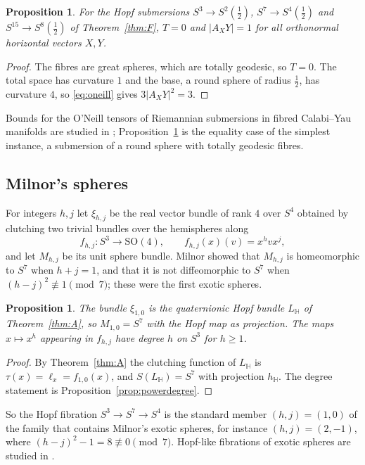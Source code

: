 \documentclass[11pt]{amsart}
\numberwithin{equation}{section}
\theoremstyle{plain}
\newtheorem{proposition}[theorem]{Proposition}
\theoremstyle{definition}
\theoremstyle{remark}
\newcommand{\Hq}{\mathbb{H}}
\newcommand{\SO}{\mathrm{SO}}
\begin{document}
\begin{proposition}\label{prop:oneill}
For the Hopf submersions $S^3\to S^2(\frac12)$, $S^7\to S^4(\frac12)$ and $S^{15}\to S^8(\frac12)$ of Theorem~\ref{thm:F}, $T=0$ and $|A_XY|=1$ for all orthonormal horizontal vectors $X,Y$.
\end{proposition}

\begin{proof}
The fibres are great spheres, which are totally geodesic, so $T=0$. The total space has curvature $1$ and the base, a round sphere of radius $\frac12$, has curvature $4$, so \eqref{eq:oneill} gives $3|A_XY|^2=3$.
\end{proof}

Bounds for the O'Neill tensors of Riemannian submersions in fibred Calabi--Yau manifolds are studied in \cite{GBN26}; Proposition~\ref{prop:oneill} is the equality case of the simplest instance, a submersion of a round sphere with totally geodesic fibres.

\subsection{Milnor's spheres}\label{sec:milnor}

For integers $h,j$ let $\xi_{h,j}$ be the real vector bundle of rank $4$ over $S^4$ obtained by clutching two trivial bundles over the hemispheres along
\[
f_{h,j}\colon S^3\to\SO(4),\qquad f_{h,j}(x)(v)=x^hvx^j,
\]
and let $M_{h,j}$ be its unit sphere bundle. Milnor \cite{Mil56} showed that $M_{h,j}$ is homeomorphic to $S^7$ when $h+j=1$, and that it is not diffeomorphic to $S^7$ when $(h-j)^2\not\equiv1\pmod 7$; these were the first exotic spheres.

\begin{proposition}\label{prop:milnorhopf}
The bundle $\xi_{1,0}$ is the quaternionic Hopf bundle $L_\Hq$ of Theorem~\ref{thm:A}, so $M_{1,0}=S^7$ with the Hopf map as projection. The maps $x\mapsto x^h$ appearing in $f_{h,j}$ have degree $h$ on $S^3$ for $h\ge1$.
\end{proposition}

\begin{proof}
By Theorem~\ref{thm:A} the clutching function of $L_\Hq$ is $\tau(x)=\ell_x=f_{1,0}(x)$, and $S(L_\Hq)=S^7$ with projection $h_\Hq$. The degree statement is Proposition~\ref{prop:powerdegree}.
\end{proof}

So the Hopf fibration $S^3\to S^7\to S^4$ is the standard member $(h,j)=(1,0)$ of the family that contains Milnor's exotic spheres, for instance $(h,j)=(2,-1)$, where $(h-j)^2-1=8\not\equiv0\pmod7$. Hopf-like fibrations of exotic spheres are studied in \cite{Bha26b}.
\appendix
\end{document}
